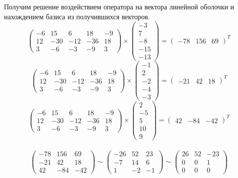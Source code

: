 \documentclass{article}
\begin{document}
\begin{center}
Получим решение воздействием оператора на вектора линейной оболочки и нахождением базиса из получившихся векторов.
$$\begin{pmatrix}
-6 & 15 & 6 & 18 & -9 \\ 12 & -30 & -12 & -36 & 18 \\ 3 & -6 & -3 & -9 & 3
\end{pmatrix}\times \begin{pmatrix}
-3 \\ 7 \\ -8 \\ -15 \\ -13
\end{pmatrix} = \begin{pmatrix}
-78 & 156 & 69
\end{pmatrix}^{T}$$
$$\begin{pmatrix}
-6 & 15 & 6 & 18 & -9 \\ 12 & -30 & -12 & -36 & 18 \\ 3 & -6 & -3 & -9 & 3
\end{pmatrix}\times \begin{pmatrix}
-1 \\ 2 \\ -2 \\ -4 \\ -3
\end{pmatrix} = \begin{pmatrix}
-21 & 42 & 18
\end{pmatrix}^{T}$$
$$\begin{pmatrix}
-6 & 15 & 6 & 18 & -9 \\ 12 & -30 & -12 & -36 & 18 \\ 3 & -6 & -3 & -9 & 3
\end{pmatrix}\times \begin{pmatrix}
2 \\ -5 \\ 5 \\ 10 \\ 9
\end{pmatrix} = \begin{pmatrix}
42 & -84 & -42
\end{pmatrix}^{T}$$ \\
$$\begin{pmatrix}
-78 & 156 & 69 \\ -21 & 42 & 18 \\ 42 & -84 & -42
\end{pmatrix} \sim \begin{pmatrix}
-26 & 52 & 23 \\ -7 & 14 & 6 \\ 1 & -2 & -1
\end{pmatrix} \sim \begin{pmatrix}
26 & 52 & -23 \\ 0 & 0 & 1 \\ 0 & 0 & 0
\end{pmatrix}$$
\end{center}
\end{document}

